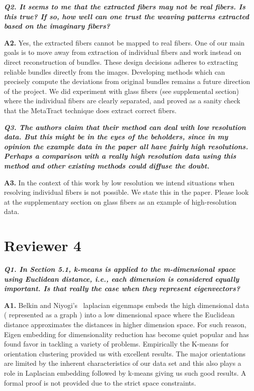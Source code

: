 \documentclass[]{article}
\begin{document}
\textbf{\textit{
Q2. It seems to me that the extracted fibers may not be real fibers. Is this
true? If so, how well can one trust the weaving patterns extracted based
on the imaginary fibers?
}}


\textbf{A2.} Yes, the extracted fibers cannot be mapped to real fibers. One of our main goals is to move away from extraction of individual fibers and work instead on direct reconstruction of bundles. These design decisions adheres to extracting reliable bundles directly from the images.
Developing methods which can precisely compute the deviations from original bundles remains a future direction of the project. We did experiment with glass fibers (see supplemental section) where the individual fibers are clearly separated, and proved as a sanity check that the MetaTract technique does extract correct fibers.
 
\makebox[\linewidth]{\rule{0.25\textwidth}{0.4pt}}


\textbf{\textit{
Q3. The authors claim that their method can deal with low resolution data.
But this might be in the eyes of the beholders, since in my opinion the example data in the paper all have fairly high resolutions. Perhaps a comparison with a really high resolution data using this method and other existing methods could diffuse the doubt.
}}


\textbf{A3.} In the context of this work by low resolution we intend situations when resolving individual fibers is not possible. We state this in the paper. Please look at the supplementary section on glass fibers as an example of high-resolution data.


\section*{Reviewer 4}

\textbf{\textit{
Q1. In Section 5.1, k-means is applied to the m-dimensional space using
Euclidean distance, i.e., each dimension is considered equally important.
Is that really the case when they represent eigenvectors?
}}


\textbf{A1.} Belkin  and Niyogi's~\cite{Belkin01} laplacian eigenmaps embeds the high dimensional data ( represented as a graph ) into a low dimensional space where the Euclidean distance approximates the distances in higher dimension space. For such reason, Eigen embedding for dimensionality reduction has become quiet popular and has found favor in tackling a variety of problems. Empirically the K-means for orientation clustering provided us with excellent results. The major orientations are limited by the inherent characteristics of our data set and this also plays a role in Laplacian embedding followed by k-means giving us such good results. A formal proof is not provided due to the strict space constraints.
 
\end{document}

